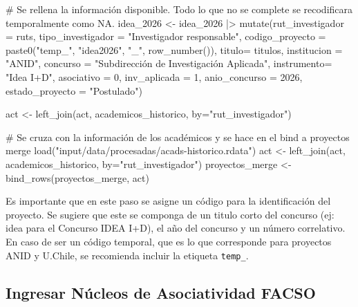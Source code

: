 \documentclass[
  spanish,
  letterpaper,
  DIV=11,
  numbers=noendperiod]{scrreprt}
\newenvironment{Shaded}{\begin{snugshade}}{\end{snugshade}}
\newcommand{\AttributeTok}[1]{\textcolor[rgb]{0.40,0.45,0.13}{#1}}
\newcommand{\CommentTok}[1]{\textcolor[rgb]{0.37,0.37,0.37}{#1}}
\newcommand{\DecValTok}[1]{\textcolor[rgb]{0.68,0.00,0.00}{#1}}
\newcommand{\FunctionTok}[1]{\textcolor[rgb]{0.28,0.35,0.67}{#1}}
\newcommand{\NormalTok}[1]{\textcolor[rgb]{0.00,0.23,0.31}{#1}}
\newcommand{\OtherTok}[1]{\textcolor[rgb]{0.00,0.23,0.31}{#1}}
\newcommand{\SpecialCharTok}[1]{\textcolor[rgb]{0.37,0.37,0.37}{#1}}
\newcommand{\StringTok}[1]{\textcolor[rgb]{0.13,0.47,0.30}{#1}}
\begin{document}
\begin{Shaded}
\begin{Highlighting}[]
\CommentTok{\# Se rellena la información disponible. Todo lo que no se complete se recodificara temporalmente como NA. }
\NormalTok{idea\_2026 }\OtherTok{\textless{}{-}}\NormalTok{ idea\_2026 }\SpecialCharTok{|\textgreater{}}
  \FunctionTok{mutate}\NormalTok{(}\AttributeTok{rut\_investigador =}\NormalTok{ ruts,}
         \AttributeTok{tipo\_investigador =} \StringTok{"Investigador responsable"}\NormalTok{,}
         \AttributeTok{codigo\_proyecto =} \FunctionTok{paste0}\NormalTok{(}\StringTok{"temp\_"}\NormalTok{, }\StringTok{"idea2026"}\NormalTok{, }\StringTok{"\_"}\NormalTok{, }\FunctionTok{row\_number}\NormalTok{()),}
         \AttributeTok{titulo=}\NormalTok{ titulos,}
         \AttributeTok{institucion =} \StringTok{"ANID"}\NormalTok{,}
         \AttributeTok{concurso =} \StringTok{"Subdirección de Investigación Aplicada"}\NormalTok{,}
         \AttributeTok{instrumento=} \StringTok{"Idea I+D"}\NormalTok{,}
         \AttributeTok{asociativo =} \DecValTok{0}\NormalTok{,}
         \AttributeTok{inv\_aplicada =} \DecValTok{1}\NormalTok{,}
         \AttributeTok{anio\_concurso =} \DecValTok{2026}\NormalTok{,}
         \AttributeTok{estado\_proyecto =} \StringTok{"Postulado"}\NormalTok{)}


\NormalTok{act }\OtherTok{\textless{}{-}} \FunctionTok{left\_join}\NormalTok{(act, academicos\_historico, }\AttributeTok{by=}\StringTok{"rut\_investigador"}\NormalTok{)}

\CommentTok{\# Se cruza con la información de los académicos y se hace en el bind a proyectos merge}
\FunctionTok{load}\NormalTok{(}\StringTok{"input/data/procesadas/acads{-}historico.rdata"}\NormalTok{)}
\NormalTok{act }\OtherTok{\textless{}{-}} \FunctionTok{left\_join}\NormalTok{(act, academicos\_historico, }\AttributeTok{by=}\StringTok{"rut\_investigador"}\NormalTok{)}
\NormalTok{proyectos\_merge }\OtherTok{\textless{}{-}} \FunctionTok{bind\_rows}\NormalTok{(proyectos\_merge, act)}
\end{Highlighting}
\end{Shaded}

Es importante que en este paso se asigne un código para la
identificación del proyecto. Se sugiere que este se componga de un
titulo corto del concurso (ej: idea para el Concurso IDEA I+D), el año
del concurso y un número correlativo. En caso de ser un código temporal,
que es lo que corresponde para proyectos ANID y U.Chile, se recomienda
incluir la etiqueta \texttt{temp\_}.

\subsection{Ingresar Núcleos de Asociatividad
FACSO}\label{ingresar-nuxfacleos-de-asociatividad-facso}
\end{document}
